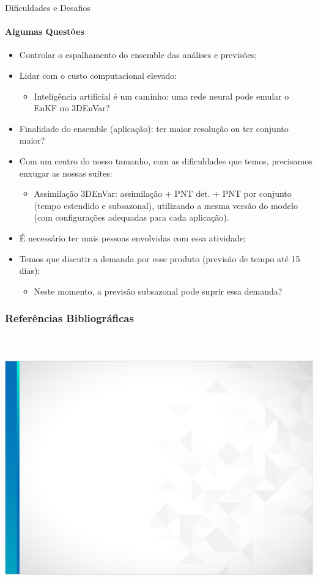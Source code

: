 \documentclass[10pt,aspectratio=169]{beamer}
\begin{document}
\begin{frame}{Dificuldades e Desafios}
\framesubtitle{Algumas Questões \faQuestionCircle}
	\begin{itemize}
		\item Controlar o espalhamento do ensemble das análises e previsões;
		\pause
		\item Lidar com o custo computacional elevado:
		\begin{itemize}
			\item Inteligência artificial é um caminho: uma rede neural pode emular o EnKF no 3DEnVar?
		\end{itemize}
		\pause
		\item Finalidade do ensemble (aplicação): ter maior resolução ou ter conjunto maior?
		\item Com um centro do nosso tamanho, com as dificuldades que temos, precisamos enxugar as nossas suítes:
		\begin{itemize}
			\item Assimilação 3DEnVar: assimilação + PNT det. + PNT por conjunto (tempo estendido e subsazonal), utilizando a mesma versão do modelo (com configurações adequadas para cada aplicação).
		\end{itemize}
		\pause
		\item É necessário ter mais pessoas envolvidas com essa atividade;
		\pause
		\item Temos que discutir a demanda por esse produto (previsão de tempo até 15 dias):
		\begin{itemize}
			\item Neste momento, a previsão subsazonal pode suprir essa demanda?
		\end{itemize}
		\pause
	\end{itemize}
\end{frame}

\begin{frame}
\frametitle{Referências Bibliográficas}
\framesubtitle{\faBookOpen~\faNewspaper[regular]~}
\vspace{-1em}
\footnotesize
\end{frame}

\usebackgroundtemplate%
{%
	\includegraphics[width=\paperwidth,height=\paperheight]{fundo_slide_inpe_sem_logo.png}%
}
\end{document}
